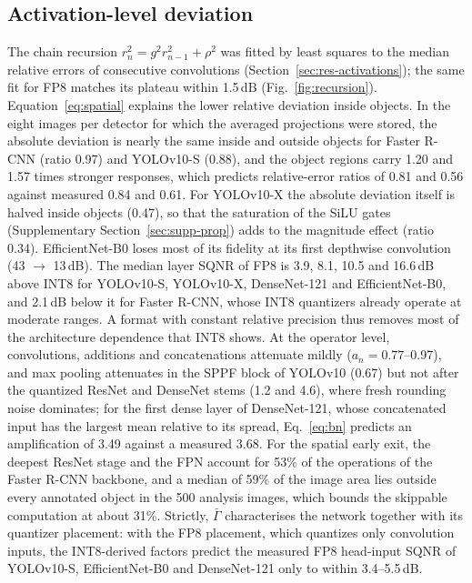 \documentclass[pdflatex,sn-mathphys-num]{sn-jnl}%
\theoremstyle{thmstyleone}%
\theoremstyle{thmstyletwo}%
\theoremstyle{thmstylethree}%
\begin{document}
\begin{appendices}
\subsection{Activation-level deviation}\label{sec:supp-res-act}
The chain recursion $r_n^2=g^2r_{n-1}^2+\rho^2$ was fitted by least squares to the median relative errors of consecutive convolutions (Section~\ref{sec:res-activations}); the same fit for FP8 matches its plateau within 1.5\,dB (Fig.~\ref{fig:recursion}). Equation~\eqref{eq:spatial} explains the lower relative deviation inside objects. In the eight images per detector for which the averaged projections were stored, the absolute deviation is nearly the same inside and outside objects for Faster R-CNN (ratio 0.97) and YOLOv10-S (0.88), and the object regions carry 1.20 and 1.57 times stronger responses, which predicts relative-error ratios of 0.81 and 0.56 against measured 0.84 and 0.61. For YOLOv10-X the absolute deviation itself is halved inside objects (0.47), so that the saturation of the SiLU gates (Supplementary Section~\ref{sec:supp-prop}) adds to the magnitude effect (ratio 0.34). EfficientNet-B0 loses most of its fidelity at its first depthwise convolution (43 $\rightarrow$ 13\,dB). The median layer SQNR of FP8 is 3.9, 8.1, 10.5 and 16.6\,dB above INT8 for YOLOv10-S, YOLOv10-X, DenseNet-121 and EfficientNet-B0, and 2.1\,dB below it for Faster R-CNN, whose INT8 quantizers already operate at moderate ranges. A format with constant relative precision thus removes most of the architecture dependence that INT8 shows. At the operator level, convolutions, additions and concatenations attenuate mildly ($a_n=0.77$--0.97), and max pooling attenuates in the SPPF block of YOLOv10 (0.67) but not after the quantized ResNet and DenseNet stems (1.2 and 4.6), where fresh rounding noise dominates; for the first dense layer of DenseNet-121, whose concatenated input has the largest mean relative to its spread, Eq.~\eqref{eq:bn} predicts an amplification of 3.49 against a measured 3.68. For the spatial early exit, the deepest ResNet stage and the FPN account for 53\% of the operations of the Faster R-CNN backbone, and a median of 59\% of the image area lies outside every annotated object in the 500 analysis images, which bounds the skippable computation at about 31\%. Strictly, $\bar\Gamma$ characterises the network together with its quantizer placement: with the FP8 placement, which quantizes only convolution inputs, the INT8-derived factors predict the measured FP8 head-input SQNR of YOLOv10-S, EfficientNet-B0 and DenseNet-121 only to within 3.4--5.5\,dB.


\end{appendices}
\end{document}
